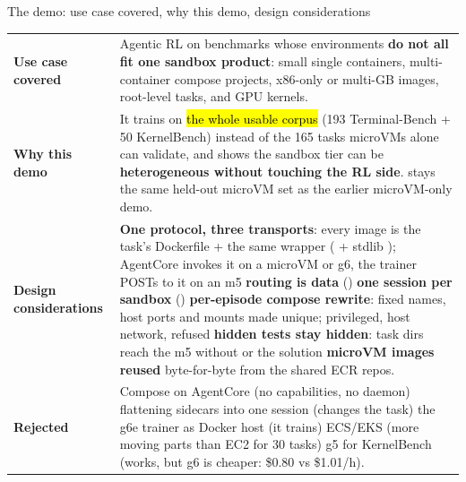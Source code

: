 \begin{frame}{The demo: use case covered, why this demo, design considerations}
\scriptsize\setlength{\tabcolsep}{4pt}
\begin{tabularx}{\textwidth}{@{}P{0.17\textwidth}Y@{}}
\toprule
\textbf{Use case covered} & Agentic RL on benchmarks whose environments \textbf{do not all fit one sandbox product}:
small single containers, multi-container compose projects, x86-only or multi-GB images, root-level tasks, and GPU kernels.\\
\textbf{Why this demo} & It trains on \hl{the whole usable corpus} (193 Terminal-Bench + 50 KernelBench) instead of the 165
tasks microVMs alone can validate, and shows the sandbox tier can be \textbf{heterogeneous without touching the RL side}.
 stays the same held-out microVM set as the earlier microVM-only demo.\\
\textbf{Design considerations} &
\textbf{One protocol, three transports}: every image is the task's Dockerfile + the same wrapper ( + stdlib
); AgentCore invokes it on a microVM or g6, the trainer POSTs to it on an m5
\textperiodcentered{} \textbf{routing is data} ()
\textperiodcentered{} \textbf{one session per sandbox} ()
\textperiodcentered{} \textbf{per-episode compose rewrite}: fixed names, host ports and  mounts made unique; privileged, host network,  refused
\textperiodcentered{} \textbf{hidden tests stay hidden}: task dirs reach the m5 without  or the solution
\textperiodcentered{} \textbf{microVM images reused} byte-for-byte from the shared  ECR repos.\\
\textbf{Rejected} & Compose on AgentCore (no capabilities, no daemon) \textperiodcentered{} flattening sidecars into one session
(changes the task) \textperiodcentered{} the g6e trainer as Docker host (it trains) \textperiodcentered{} ECS/EKS (more moving parts than
EC2 for 30 tasks) \textperiodcentered{} g5 for KernelBench (works, but g6 is cheaper: \$0.80 vs \$1.01/h).\\
\bottomrule
\end{tabularx}
\end{frame}

